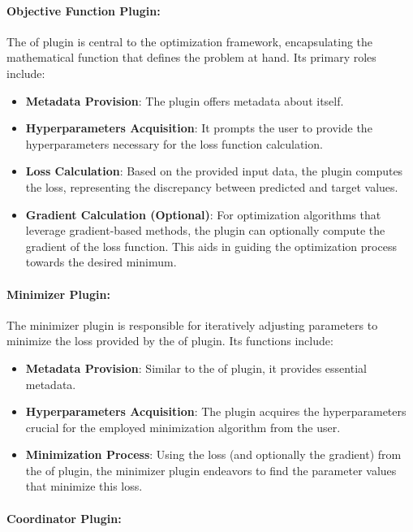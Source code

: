 \documentclass[
  a4paper,  %
  twoside,  %
  bibliography=totoc,
  headsepline,
  cleardoublepage=empty,
  parskip=half,
  draft=false
]{scrbook}
\begin{document}
\paragraph{Objective Function Plugin:}

The \gls{of} plugin is central to the optimization framework, encapsulating the mathematical function that defines the problem at hand.
Its primary roles include:

\begin{itemize}
\item \textbf{Metadata Provision}: The plugin offers metadata about itself.
\item \textbf{Hyperparameters Acquisition}: It prompts the user to provide the hyperparameters necessary for the loss function calculation.
\item \textbf{Loss Calculation}: Based on the provided input data, the plugin computes the loss, representing the discrepancy between predicted and target values.
\item \textbf{Gradient Calculation (Optional)}: For optimization algorithms that leverage gradient-based methods, the plugin can optionally compute the gradient of the loss function.
This aids in guiding the optimization process towards the desired minimum.
\end{itemize}

\paragraph{Minimizer Plugin:}

The minimizer plugin is responsible for iteratively adjusting parameters to minimize the loss provided by the \gls{of} plugin.
Its functions include:

\begin{itemize}
\item \textbf{Metadata Provision}: Similar to the \gls{of} plugin, it provides essential metadata.
\item \textbf{Hyperparameters Acquisition}: The plugin acquires the hyperparameters crucial for the employed minimization algorithm from the user.
\item \textbf{Minimization Process}: Using the loss (and optionally the gradient) from the \gls{of} plugin, the minimizer plugin endeavors to find the parameter values that minimize this loss.
\end{itemize}

\paragraph{Coordinator Plugin:}
\end{document}
